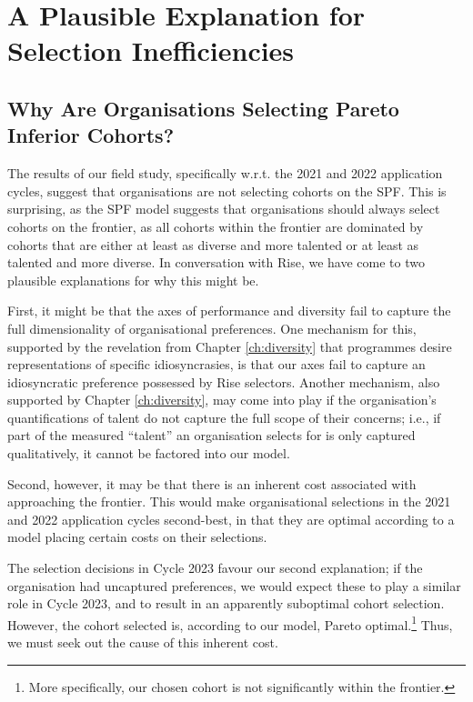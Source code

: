 \section{A Plausible Explanation for Selection Inefficiencies}\label{sec:spfexplanation}
\subsection{Why Are Organisations Selecting Pareto Inferior Cohorts?}\label{subsec:dts_nphard}
The results of our field study, specifically w.r.t. the 2021 and 2022 application cycles, suggest that organisations are not selecting cohorts on the SPF. This is surprising, as the SPF model suggests that organisations should always select cohorts on the frontier, as all cohorts within the frontier are dominated by cohorts that are either at least as diverse and more talented or at least as talented and more diverse. In conversation with Rise, we have come to two plausible explanations for why this might be.

First, it might be that the axes of performance and diversity fail to capture the full dimensionality of organisational preferences. One mechanism for this, supported by the revelation from Chapter \ref{ch:diversity} that programmes desire representations of specific idiosyncrasies, is that our axes fail to capture an idiosyncratic preference possessed by Rise selectors. Another mechanism, also supported by Chapter \ref{ch:diversity}, may come into play if the organisation's quantifications of talent do not capture the full scope of their concerns; i.e., if part of the measured ``talent'' an organisation selects for is only captured qualitatively, it cannot be factored into our model.

Second, however, it may be that there is an inherent cost associated with approaching the frontier. This would make organisational selections in the 2021 and 2022 application cycles second-best, in that they are optimal according to a model placing certain costs on their selections. 

The selection decisions in Cycle 2023 favour our second explanation; if the organisation had uncaptured preferences, we would expect these to play a similar role in Cycle 2023, and to result in an apparently suboptimal cohort selection. However, the cohort selected is, according to our model, Pareto optimal.\footnote{More specifically, our chosen cohort is not significantly within the frontier.} Thus, we must seek out the cause of this inherent cost.

